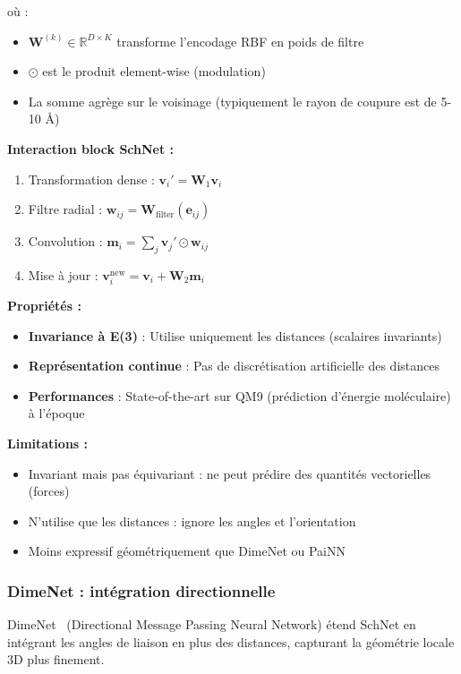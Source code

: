 où :
\begin{itemize}
    \item $\mathbf{W}^{(k)} \in \mathbb{R}^{D \times K}$ transforme l'encodage RBF en poids de filtre
    \item $\odot$ est le produit element-wise (modulation)
    \item La somme agrège sur le voisinage (typiquement le rayon de coupure est de 5-10 Å)
\end{itemize}

\textbf{Interaction block SchNet :}
\begin{enumerate}
    \item Transformation dense : $\mathbf{v}_i' = \mathbf{W}_1 \mathbf{v}_i$
    \item Filtre radial : $\mathbf{w}_{ij} = \mathbf{W}_{\text{filter}}(\mathbf{e}_{ij})$
    \item Convolution : $\mathbf{m}_i = \sum_j \mathbf{v}_j' \odot \mathbf{w}_{ij}$
    \item Mise à jour : $\mathbf{v}_i^{\text{new}} = \mathbf{v}_i + \mathbf{W}_2 \mathbf{m}_i$
\end{enumerate}

\textbf{Propriétés :}
\begin{itemize}
    \item \textbf{Invariance à E(3)} : Utilise uniquement les distances (scalaires invariants)
    \item \textbf{Représentation continue} : Pas de discrétisation artificielle des distances
    \item \textbf{Performances} : State-of-the-art sur QM9 (prédiction d'énergie moléculaire) à l'époque
\end{itemize}

\textbf{Limitations :}
\begin{itemize}
    \item Invariant mais pas équivariant : ne peut prédire des quantités vectorielles (forces)
    \item N'utilise que les distances : ignore les angles et l'orientation
    \item Moins expressif géométriquement que DimeNet ou PaiNN
\end{itemize}

\subsubsection{DimeNet : intégration directionnelle}

DimeNet~\cite{Gasteiger2020} (Directional Message Passing Neural Network) étend SchNet en intégrant les angles de liaison en plus des distances, capturant la géométrie locale 3D plus finement.

